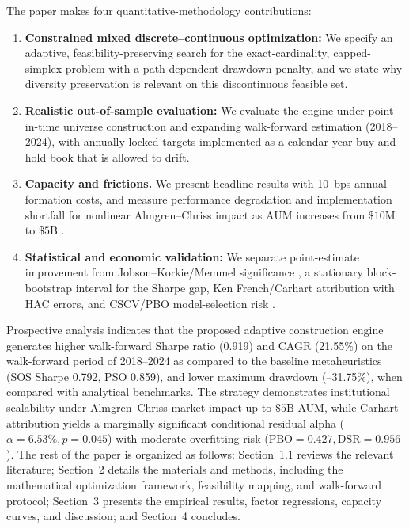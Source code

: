 \documentclass[11pt,a4paper]{article}
\begin{document}
The paper makes four quantitative-methodology contributions:

\begin{enumerate}

\item \textbf{Constrained mixed discrete--continuous optimization:} We specify an adaptive, feasibility-preserving search for the exact-cardinality, capped-simplex problem with a path-dependent drawdown penalty, and we state why diversity preservation is relevant on this discontinuous feasible set.

\item \textbf{Realistic out-of-sample evaluation:} We evaluate the engine under point-in-time universe construction and expanding walk-forward estimation (2018--2024), with annually locked targets implemented as a calendar-year buy-and-hold book that is allowed to drift.

\item \textbf{Capacity and frictions.} We present headline results with 10~bps annual formation costs, and measure performance degradation and implementation shortfall for nonlinear Almgren--Chriss impact as AUM increases from $\$10\text{M}$ to $\$5\text{B}$ \cite{almgren2001, horst2024}.

\item \textbf{Statistical and economic validation:} We separate point-estimate improvement from Jobson--Korkie/Memmel significance \cite{jobson1981, memmel2003}, a stationary block-bootstrap interval for the Sharpe gap, Ken French/Carhart attribution with HAC errors, and CSCV/PBO model-selection risk \cite{bailey2017, prado2018}.

\end{enumerate}

Prospective analysis indicates that the proposed adaptive construction engine generates higher walk-forward Sharpe ratio (0.919) and CAGR (21.55\%) on the walk-forward period of 2018--2024 as compared to the baseline metaheuristics (SOS Sharpe 0.792, PSO 0.859), and lower maximum drawdown (--31.75\%), when compared with analytical benchmarks. The strategy demonstrates institutional scalability under Almgren--Chriss market impact up to $\$5\text{B}$ AUM, while Carhart attribution yields a marginally significant conditional residual alpha ($\alpha = 6.53\%, p=0.045$) with moderate overfitting risk ($\text{PBO} = 0.427, \text{DSR} = 0.956$). The rest of the paper is organized as follows: Section~1.1 reviews the relevant literature; Section~2 details the materials and methods, including the mathematical optimization framework, feasibility mapping, and walk-forward protocol; Section~3 presents the empirical results, factor regressions, capacity curves, and discussion; and Section~4 concludes.
\end{document}

